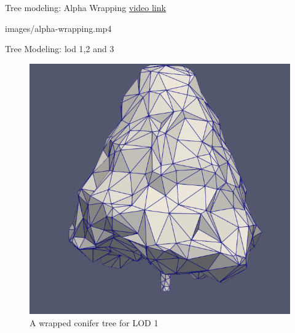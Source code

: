 \documentclass[10pt]{beamer}
\begin{document}
  \begin{frame}{Tree modeling: Alpha Wrapping}
	\Large
	\href{https://youtu.be/xIIDolWCrgU}{video link}
	\begin{center}
	  \movie[width=1\textwidth,height=0.8\textheight,poster,showcontrols]{}
	  {images/alpha-wrapping.mp4}
	\end{center}
  \end{frame}

\begin{frame}{Tree Modeling: lod 1,2 and 3}
	\begin{figure}[h]
		\centering
		\begin{minipage}{0.3\textwidth}
			\centering
			\includegraphics[width=\textwidth]{images/tree-cone_lod1.png}
			\caption{A wrapped conifer tree for LOD 1}
			\label{fig:figure1}
		\end{minipage}\hfill
		\begin{minipage}{0.3\textwidth}
			\centering

\end{minipage}
\end{figure}
\end{frame}
\end{document}
